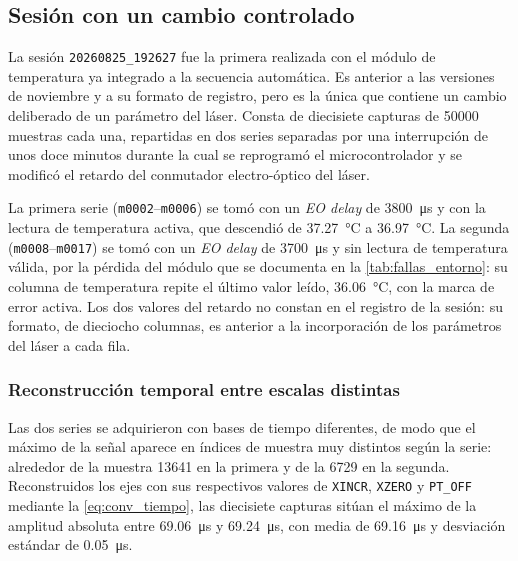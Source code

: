 \subsection{Sesión con un cambio controlado}
\label{sec:sesion_referencia}

La sesión \texttt{20260825\_192627} fue la primera realizada con el
módulo de temperatura ya integrado a la secuencia automática. Es
anterior a las versiones de noviembre y a su formato de registro, pero
es la única que contiene un cambio deliberado de un parámetro del
láser. Consta de diecisiete capturas de \num{50000} muestras cada una,
repartidas en dos series separadas por una interrupción de unos doce
minutos durante la cual se reprogramó el microcontrolador y se modificó
el retardo del conmutador electro-óptico del láser.

La primera serie (\texttt{m0002}--\texttt{m0006}) se tomó con un
\textit{EO delay} de \SI{3800}{\micro\second} y con la lectura de
temperatura activa, que descendió de \SI{37.27}{\celsius} a
\SI{36.97}{\celsius}. La segunda (\texttt{m0008}--\texttt{m0017}) se
tomó con un \textit{EO delay} de \SI{3700}{\micro\second} y sin lectura
de temperatura válida, por la pérdida del módulo que se documenta en la
\cref{tab:fallas_entorno}: su columna de temperatura repite el último
valor leído, \SI{36.06}{\celsius}, con la marca de error activa. Los
dos valores del retardo no constan en el registro de la sesión: su
formato, de dieciocho columnas, es anterior a la incorporación de los
parámetros del láser a cada fila.

\subsubsection{Reconstrucción temporal entre escalas distintas}
\label{sec:reconstruccion_escalas}

Las dos series se adquirieron con bases de tiempo diferentes, de modo
que el máximo de la señal aparece en índices de muestra muy distintos
según la serie: alrededor de la muestra \num{13641} en la primera y de
la \num{6729} en la segunda. Reconstruidos los ejes con sus respectivos
valores de \texttt{XINCR}, \texttt{XZERO} y \texttt{PT\_OFF} mediante la
\cref{eq:conv_tiempo}, las diecisiete capturas sitúan el máximo de la
amplitud absoluta entre \SI{69.06}{\micro\second} y
\SI{69.24}{\micro\second}, con media de \SI{69.16}{\micro\second} y
desviación estándar de \SI{0.05}{\micro\second}.

